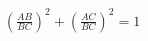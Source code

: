 \documentclass[preview]{standalone}
\begin{document}
\begin{align*}
\left(\frac{AB}{BC}\right)^2 + \left(\frac{AC}{BC}\right)^2 = 1
\end{align*}
\end{document}
